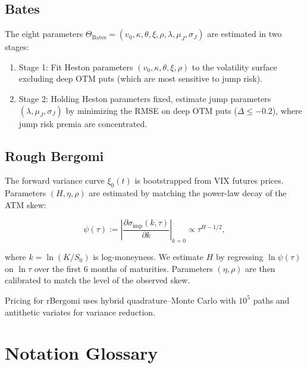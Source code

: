\documentclass[11pt,a4paper]{article}
\theoremstyle{plain}
\theoremstyle{definition}
\theoremstyle{remark}
\newcommand{\BatesM}{\text{Bates}}
\begin{document}
\subsection{Bates}

The eight parameters $\Theta_{\BatesM} = (v_0, \kappa, \theta, \xi, \rho, \lambda, \mu_J, \sigma_J)$ are estimated in two stages:
\begin{enumerate}[nosep]
  \item Stage 1: Fit Heston parameters $(v_0, \kappa, \theta, \xi, \rho)$ to the volatility surface excluding deep OTM puts (which are most sensitive to jump risk).
  \item Stage 2: Holding Heston parameters fixed, estimate jump parameters $(\lambda, \mu_J, \sigma_J)$ by minimizing the RMSE on deep OTM puts ($\Delta \leq -0.2$), where jump risk premia are concentrated.
\end{enumerate}

\subsection{Rough Bergomi}

The forward variance curve $\xi_0(t)$ is bootstrapped from VIX futures prices. Parameters $(H, \eta, \rho)$ are estimated by matching the power-law decay of the ATM skew:

\begin{equation}\label{eq:rbergomi_skew}
  \psi(\tau) := \left|\frac{\partial \sigma_{\text{imp}}(k, \tau)}{\partial k}\right|_{k=0} \propto \tau^{H-1/2},
\end{equation}

where $k = \ln(K/S_0)$ is log-moneyness. We estimate $H$ by regressing $\ln \psi(\tau)$ on $\ln \tau$ over the first 6 months of maturities. Parameters $(\eta, \rho)$ are then calibrated to match the level of the observed skew.

Pricing for rBergomi uses hybrid quadrature--Monte Carlo with $10^5$ paths and antithetic variates for variance reduction.

\section{Notation Glossary}
\end{document}
